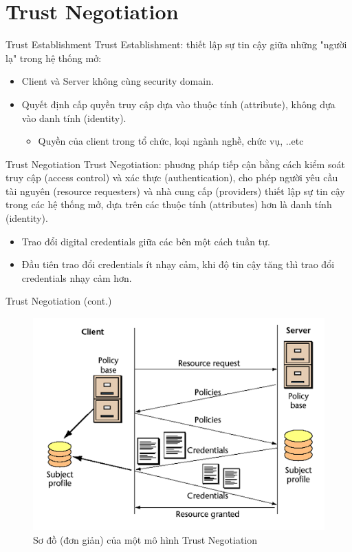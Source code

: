 \documentclass[11pt]{beamer}
\newcommand{\eg}{\text{e.g.\ }}
\begin{document}
\section{Trust Negotiation}
\begin{frame}{Trust Establishment}
Trust Establishment: thiết lập sự tin cậy giữa những "người lạ" trong hệ thống mở:
\begin{itemize}
\item Client và Server không cùng security domain.
\item Quyết định cấp quyền truy cập dựa vào thuộc tính (attribute), không dựa vào danh tính (identity).
\begin{itemize}
\item \eg Quyền của client trong tổ chức, loại ngành nghề, chức vụ, ..etc
\end{itemize}
\end{itemize}
\end{frame}

\begin{frame}{Trust Negotiation}
Trust Negotiation: phuơng pháp tiếp cận bằng cách kiểm soát truy cập (access control) và xác thực (authentication), cho phép người yêu cầu tài nguyên (resource requesters) và nhà cung cấp (providers) thiết lập sự tin cậy trong các hệ thống mở, dựa trên các thuộc tính (attributes) hơn là danh tính (identity).
\begin{itemize}
\item Trao đổi digital credentials giữa các bên một cách tuần tự.
\item Đầu tiên trao đổi credentials ít nhạy cảm, khi độ tin cậy tăng thì trao đổi credentials nhạy cảm hơn.
\end{itemize}
\end{frame}


\begin{frame}{Trust Negotiation (cont.)}
\begin{figure}[H]
\centering
\includegraphics[scale=.4]{img/trust-simple.png}
\caption{Sơ đồ (đơn giản) của một mô hình Trust Negotiation}
\end{figure}
\end{frame}
\end{document}
